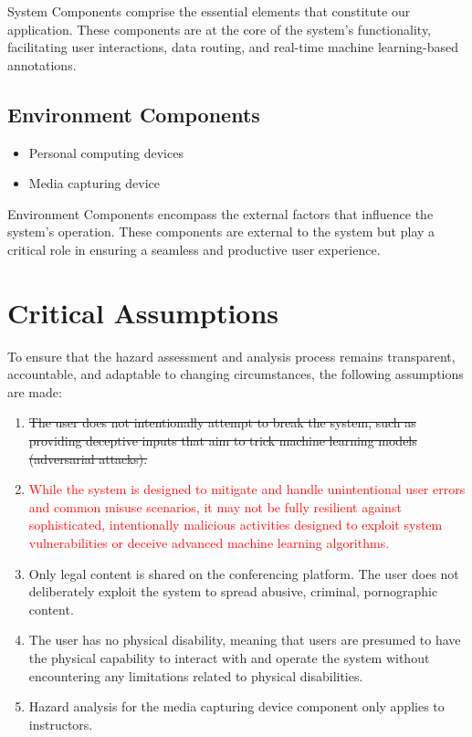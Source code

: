 \documentclass{article}
\begin{document}
System Components comprise the essential elements that constitute our
application. These components are at the core of the system's functionality,
facilitating user interactions, data routing, and real-time machine
learning-based annotations.

\subsection{Environment Components}

\begin{itemize}
\item Personal computing devices
\item Media capturing device
\end{itemize}

Environment Components encompass the external factors that influence the
system's operation. These components are external to the system but play a
critical role in ensuring a seamless and productive user experience.

\section{Critical Assumptions}

To ensure that the hazard assessment and analysis process remains transparent,
accountable, and adaptable to changing circumstances, the following assumptions
are made:

\begin{enumerate}
\item \sout{The user does not intentionally attempt to break the system, such as
providing deceptive inputs that aim to trick machine learning models
(adversarial attacks).}
\item \textcolor{red}{While the system is designed to mitigate and handle unintentional 
  user errors and common misuse scenarios, it may not be fully resilient against 
  sophisticated, intentionally malicious activities designed to exploit system 
  vulnerabilities or deceive advanced machine learning algorithms.}
\item Only legal content is shared on the conferencing platform. The user does not
  deliberately exploit the system to spread abusive, criminal, pornographic
  content.
\item The user has no physical disability, meaning that users are presumed to have
  the physical capability to interact with and operate the system without
  encountering any limitations related to physical disabilities.
\item Hazard analysis for the media capturing device component only applies to
  instructors.
\end{enumerate}
\end{document}
